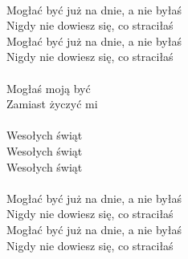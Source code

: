  \\
Mogłać być już na dnie, a nie byłaś\\
Nigdy nie dowiesz się, co straciłaś\\
Mogłać być już na dnie, a nie byłaś\\
Nigdy nie dowiesz się, co straciłaś\\
 \\
Mogłaś moją być\\
Zamiast życzyć mi\\
 \\
Wesołych świąt\\
Wesołych świąt\\
Wesołych świąt\\
 \\
Mogłać być już na dnie, a nie byłaś\\
Nigdy nie dowiesz się, co straciłaś\\
Mogłać być już na dnie, a nie byłaś\\
Nigdy nie dowiesz się, co straciłaś\\
\newpage


